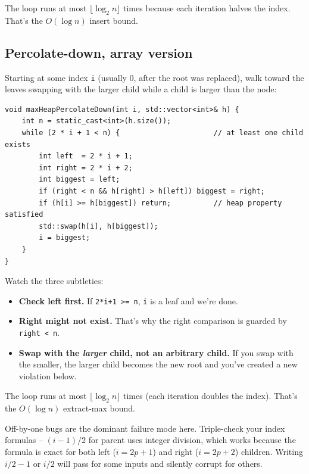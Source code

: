 \documentclass[11pt]{article}
\begin{document}
The loop runs at most $\lfloor \log_2 n \rfloor$ times because each iteration halves the index. That's the $O(\log n)$ insert bound.

\subsection*{Percolate-down, array version}

Starting at some index \texttt{i} (usually 0, after the root was replaced), walk toward the leaves swapping with the larger child while a child is larger than the node:

\begin{lstlisting}
void maxHeapPercolateDown(int i, std::vector<int>& h) {
    int n = static_cast<int>(h.size());
    while (2 * i + 1 < n) {                      // at least one child exists
        int left  = 2 * i + 1;
        int right = 2 * i + 2;
        int biggest = left;
        if (right < n && h[right] > h[left]) biggest = right;
        if (h[i] >= h[biggest]) return;          // heap property satisfied
        std::swap(h[i], h[biggest]);
        i = biggest;
    }
}
\end{lstlisting}

Watch the three subtleties:
\begin{itemize}[leftmargin=*]
    \item \textbf{Check left first.} If \texttt{2*i+1 >= n}, \texttt{i} is a leaf and we're done.
    \item \textbf{Right might not exist.} That's why the right comparison is guarded by \texttt{right < n}.
    \item \textbf{Swap with the \emph{larger} child, not an arbitrary child.} If you swap with the smaller, the larger child becomes the new root and you've created a new violation below.
\end{itemize}

The loop runs at most $\lfloor \log_2 n \rfloor$ times (each iteration doubles the index). That's the $O(\log n)$ extract-max bound.

\begin{warnbox}
Off-by-one bugs are the dominant failure mode here. Triple-check your index formulas -- $(i-1)/2$ for parent uses integer division, which works because the formula is exact for both left ($i = 2p+1$) and right ($i = 2p+2$) children. Writing $i/2 - 1$ or $i/2$ will pass for some inputs and silently corrupt for others.
\end{warnbox}
\end{document}
